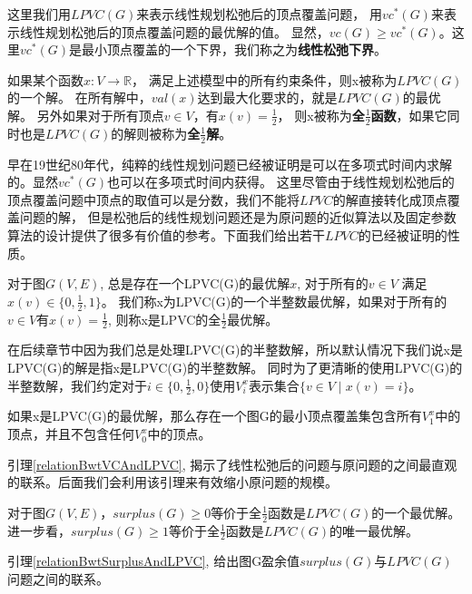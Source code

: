 这里我们用$LPVC(G)$来表示线性规划松弛后的顶点覆盖问题，
用$vc^{*}(G)$来表示线性规划松弛后的顶点覆盖问题的最优解的值。
显然，$vc(G) \ge vc^*(G)$。这里$vc^{*}(G)$是最小顶点覆盖的一个下界，我们称之为\textbf{线性松弛下界}。

如果某个函数$x:V \rightarrow \mathbb{R}$， 满足上述模型中的所有约束条件，则x被称为$LPVC(G)$的一个解。
在所有解中，$val(x)$达到最大化要求的，就是$LPVC(G)$的最优解。
另外如果对于所有顶点$v \in V$，有$x(v) = \frac{1}{2}$，
则x被称为\textbf{全$\frac{1}{2}$函数}，如果它同时也是$LPVC(G)$的解则被称为\textbf{全$\frac{1}{2}$解}。



早在19世纪80年代，纯粹的线性规划问题已经被证明是可以在多项式时间内求解的\cite{khachiian1979polynomial}。显然$vc^{*}(G)$也可以在多项式时间内获得。
这里尽管由于线性规划松弛后的顶点覆盖问题中顶点的取值可以是分数，我们不能将$LPVC$的解直接转化成顶点覆盖问题的解，
但是松弛后的线性规划问题还是为原问题的近似算法以及固定参数算法的设计提供了很多有价值的参考。下面我们给出若干$LPVC$的已经被证明的性质。
\begin{lemma}
对于图$G(V, E)$, 总是存在一个LPVC(G)的最优解$x$, 对于所有的$v \in V$ 满足$x(v) \in \{0, \frac{1}{2}, 1\}$。
我们称x为LPVC(G)的一个半整数最优解，如果对于所有的$v \in V$有$x(v) = \frac{1}{2}$, 则称x是LPVC的全$\frac{1}{2}$最优解。
\end{lemma}

在后续章节中因为我们总是处理LPVC(G)的半整数解，所以默认情况下我们说x是LPVC(G)的解是指x是LPVC(G)的半整数解。
同时为了更清晰的使用LPVC(G)的半整数解，我们约定对于$i \in \{0, \frac{1}{2}, 0\}$使用$V^x_i$表示集合$\{v \in V\;|\; x(v) = i\}$。

\begin{lemma}\label{relationBwtVCAndLPVC}
如果x是LPVC(G)的最优解，那么存在一个图G的最小顶点覆盖集包含所有$V^x_1$中的顶点，并且不包含任何$V^x_0$中的顶点。
\end{lemma}

引理\ref{relationBwtVCAndLPVC}, 揭示了线性松弛后的问题与原问题的之间最直观的联系。后面我们会利用该引理来有效缩小原问题的规模。

\begin{lemma}\label{relationBwtSurplusAndLPVC}
对于图$G(V, E)$，$surplus(G) \ge 0$等价于全$\frac{1}{2}$函数是$LPVC(G)$的一个最优解。
进一步看，$surplus(G) \ge 1$等价于全$\frac{1}{2}$函数是$LPVC(G)$的唯一最优解。
\end{lemma}

引理\ref{relationBwtSurplusAndLPVC}, 给出图G盈余值$surplus(G)$与$LPVC(G)$问题之间的联系。


